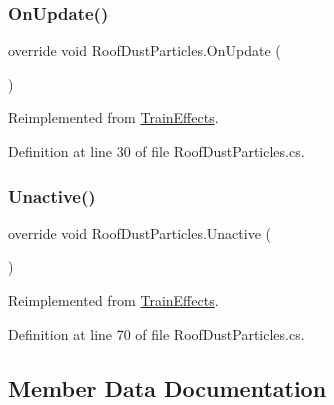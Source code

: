 \mbox{\label{class_roof_dust_particles_afbc9f6eba4034be6c2f9899b68dca63c}} 
\subsubsection{\texorpdfstring{On\+Update()}{OnUpdate()}}
{\footnotesize\ttfamily override void Roof\+Dust\+Particles.\+On\+Update (\begin{DoxyParamCaption}{ }\end{DoxyParamCaption})\hspace{0.3cm}{\ttfamily [virtual]}}



Reimplemented from \mbox{\hyperlink{class_train_effects_a245e2891464a93bda2d8f80c1fb53e2c}{Train\+Effects}}.



Definition at line 30 of file Roof\+Dust\+Particles.\+cs.

\mbox{\label{class_roof_dust_particles_a3b1f935efa79fca67c5556425b0210ae}} 
\subsubsection{\texorpdfstring{Unactive()}{Unactive()}}
{\footnotesize\ttfamily override void Roof\+Dust\+Particles.\+Unactive (\begin{DoxyParamCaption}{ }\end{DoxyParamCaption})\hspace{0.3cm}{\ttfamily [virtual]}}



Reimplemented from \mbox{\hyperlink{class_train_effects_a126011673013f79d482f135be84afc96}{Train\+Effects}}.



Definition at line 70 of file Roof\+Dust\+Particles.\+cs.



\subsection{Member Data Documentation}
\mbox{\label{class_roof_dust_particles_a6902fe9ce67824fd2c79a62ef831acfc}} 
